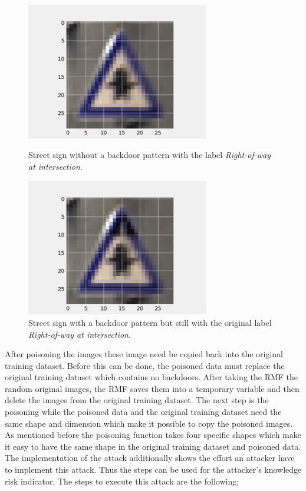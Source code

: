 \begin{figure}[!tbp]
  \centering
  \begin{minipage}[b]{0.4\textwidth}
    \includegraphics[width=8cm]{pictures/original_example.png}
    \caption{Street sign without a backdoor pattern with the label \textit{Right-of-way at intersection}.}
    \label{fig:original_example}
  \end{minipage}
  \hfill
  \begin{minipage}[b]{0.4\textwidth}
    \includegraphics[width=8cm]{pictures/poisoned_example.png}
    \caption{Street sign with a backdoor pattern but still with the original label \textit{Right-of-way at intersection}.}
    \label{fig:poisoned_example}
  \end{minipage}
\end{figure}

After poisoning the images these image need be copied back into the original training dataset. Before this can be done, the poisoned data must replace the original training dataset which contains
no backdoors. After taking the RMF the random original images, the RMF saves them into a temporary variable and then delete the images from the original training dataset. The next step is the
poisoning while the poisoned data and the original training dataset need the same shape and dimension which make it possible to copy the poisoned images. As mentioned before the poisoning
function takes four specific shapes which make it easy to have the same shape in the original training dataset and poisoned data. The implementation of the attack additionally shows the
effort an attacker have to implement this attack. Thus the steps can be used for the attacker's knowledge risk indicator. The steps to execute this attack are the following: \\

